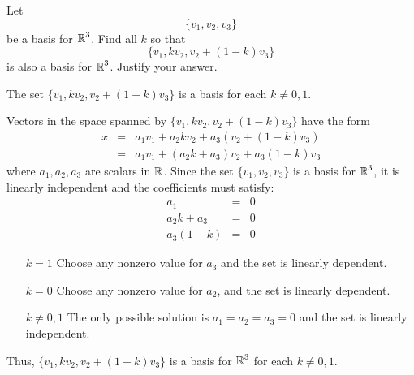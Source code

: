 \documentclass{ximera}
\author{Marty Golubitsky}
\begin{document}
\begin{exercise} \label{a5.5.900}
Let 
\[
\{v_1,v_2,v_3\}
\]
 be a basis for $\mbox{$\Bbb{R}$}^3$.  Find all $k$ so that 
\[
\{v_1,kv_2,v_2+(1-k)v_3\}
\]
is also a basis for $\mbox{$\Bbb{R}$}^3$.  Justify your answer.

\begin{solution}

\ans The set $\{v_1,kv_2,v_2+(1-k)v_3\}$ is a basis for each $k\neq 0,1$.

\soln 
Vectors in the space spanned by $\{v_1,kv_2,v_2+(1-k)v_3\}$ have the form
\begin{eqnarray*}
x & = & a_1 v_1 + a_2 kv_2 +a_3 (v_2+(1-k)v_3)\\
& = & a_1 v_1 + (a_2 k + a_3)v_2 + a_3 (1-k) v_3
\end{eqnarray*}
where $a_1,a_2,a_3$ are scalars in $\mbox{$\Bbb{R}$}$.
Since the set $\{v_1,v_2,v_3\}$ is a basis for $\mbox{$\Bbb{R}$}^3$, it is linearly independent and the coefficients must satisfy:
\begin{eqnarray*}
a_1 & = & 0\\
a_2 k + a_3 & = & 0\\
a_3 (1-k) & = & 0
\end{eqnarray*}

\begin{itemize}
\item[$k=1$]  Choose any nonzero value for $a_3$ and the set is linearly dependent.

\item[$k=0$] Choose any nonzero value for $a_2$, and the set is linearly dependent.

\item[$k\neq 0,1$] The only possible solution is $a_1=a_2=a_3=0$ and the set is linearly independent.
\end{itemize}
Thus, $\{v_1, kv_2, v_2+(1-k)v_3\}$ is a basis for $\mbox{$\Bbb{R}$}^3$ for each $k\neq 0,1$.


\end{solution}
\end{exercise}
\end{document}
